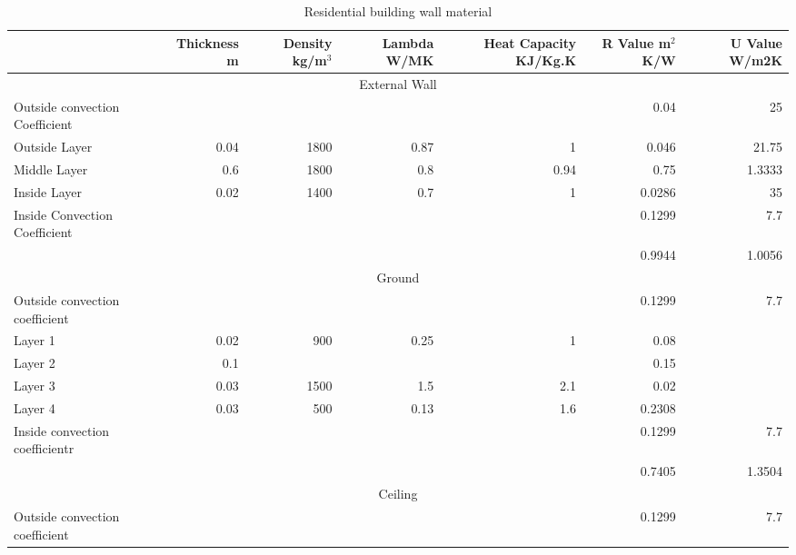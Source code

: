 \documentclass[a4paper, oneside]{discothesis}
\begin{document}
			\newpage
			\begin{table}[h!]
			  \centering
			\caption{Residential building wall material}
			    \begin{tabular}{rrrrrrr}
			    \toprule
			         & \multicolumn{1}{p{3.93em}}{Thickness m} & \multicolumn{1}{p{3.07em}}{Density kg/m$^3$} & \multicolumn{1}{p{3.145em}}{Lambda W/MK} & \multicolumn{1}{p{3.57em}}{Heat Capacity KJ/Kg.K} & \multicolumn{1}{p{3.355em}}{R Value m$^2$K/W} & \multicolumn{1}{p{3.355em}}{U Value W/m2K} \\
			    \midrule
			    \multicolumn{7}{c}{External Wall} \\
			    \midrule
			    \multicolumn{1}{l}{Outside convection Coefficient} &      &      &      &      & 0.04 & 25 \\
			    \multicolumn{1}{l}{Outside Layer} & 0.04 & 1800 & 0.87 & 1    & 0.046 & 21.75 \\
			    \multicolumn{1}{l}{Middle Layer} & 0.6  & 1800 & 0.8  & 0.94 & 0.75 & 1.3333 \\
			    \multicolumn{1}{l}{Inside Layer} & 0.02 & 1400 & 0.7  & 1    & 0.0286 & 35 \\
			    \multicolumn{1}{l}{Inside Convection Coefficient} &      &      &      &      & 0.1299 & 7.7 \\
			         &      &      &      &      & 0.9944 & 1.0056 \\
			    \midrule
			    \multicolumn{7}{c}{Ground} \\
			    \midrule
			    \multicolumn{1}{l}{Outside convection coefficient} &      &      &      &      & 0.1299 & 7.7 \\
			    \multicolumn{1}{l}{Layer 1} & 0.02 & 900  & 0.25 & 1    & 0.08 &  \\
			    \multicolumn{1}{l}{Layer 2} & 0.1  &      &      &      & 0.15 &  \\
			    \multicolumn{1}{l}{Layer 3} & 0.03 & 1500 & 1.5  & 2.1  & 0.02 &  \\
			    \multicolumn{1}{l}{Layer 4} & 0.03 & 500  & 0.13 & 1.6  & 0.2308 &  \\
			    \multicolumn{1}{l}{Inside convection coefficientr} &      &      &      &      & 0.1299 & 7.7 \\
			         &      &      &      &      & 0.7405 & 1.3504 \\
			    \midrule
			    \multicolumn{7}{c}{Ceiling} \\
			    \midrule
			    \multicolumn{1}{l}{Outside convection coefficient} &      &      &      &      & 0.1299 & 7.7 \\

\end{tabular}
\end{table}
\end{document}
